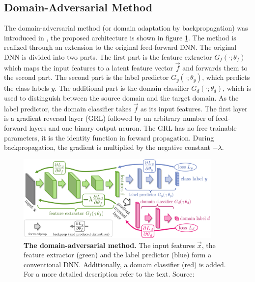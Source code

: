 \subsection{Domain-Adversarial Method}
The domain-adversarial method (or domain adaptation by backpropagation) was introduced in \cite{DA_Backprop, DA_Adversarial}, the proposed architecture is shown in figure \ref{fig:ch_4_DA_Backprop}. The method is realized through an extension to the original feed-forward DNN. The original DNN is divided into two parts. The first part is the feature extractor $G_f(\cdot;\theta_f)$ which maps the input features to a latent feature vector $\vec{f}$ and forwards them to the second part. The second part is the label predictor $G_y(\cdot;\theta_y)$, which predicts the class labels $y$. The additional part is the domain classifier $G_d(\cdot;\theta_d)$, which is used to distinguish between the source domain and the target domain. As the label predictor, the domain classifier takes $\vec{f}$ as its input features. The first layer is a gradient reversal layer (GRL) followed by an arbitrary number of feed-forward layers and one binary output neuron. The GRL has no free trainable parameters, it is the identity function in forward propagation. During backpropagation, the gradient is multiplied by the negative constant $-\lambda$.\\ 

\begin{figure}
\centering
\includegraphics[width=0.9\textwidth]{chapter_4_stat/gradReversal.png}
\caption[Domain-Adversarial Method]{\textbf{The domain-adversarial method.} The input features $\vec{x}$, the feature extractor (green) and the label predictor (blue) form a conventional DNN. Additionally, a domain classifier (red) is added. For a more detailed description refer to the text. Source: \cite{DA_Adversarial}}
\label{fig:ch_4_DA_Backprop}
\end{figure}


